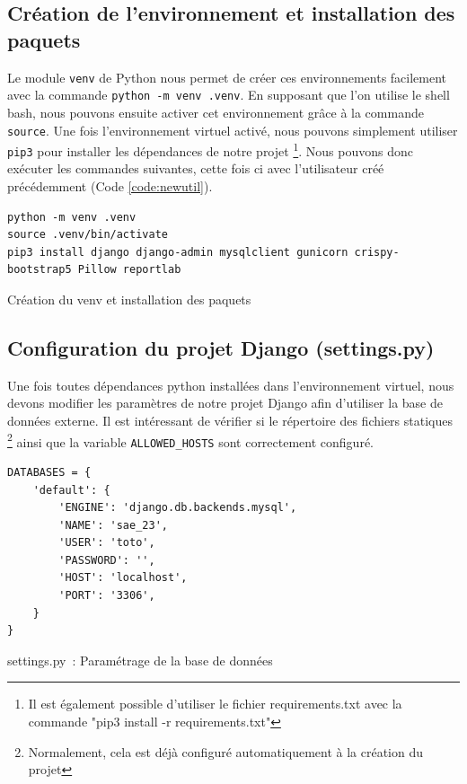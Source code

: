 \documentclass{article}
\begin{document}
        \subsection{Création de l'environnement et installation des paquets}
        Le module \verb|venv| de Python nous permet de créer ces environnements facilement avec la commande \verb|python -m venv .venv|.
        En supposant que l'on utilise le shell bash, nous pouvons ensuite activer cet environnement grâce à la commande \verb|source|.
        Une fois l'environnement virtuel activé, nous pouvons simplement utiliser \verb|pip3| pour installer les dépendances de notre projet
        \footnote{\label{note2}Il est également possible d'utiliser le fichier requirements.txt avec la commande "pip3 install -r requirements.txt"}. 
        Nous pouvons donc exécuter les commandes suivantes, cette fois ci avec l'utilisateur créé précédemment (Code \ref{code:newutil}). 
        \begin{listing}[H]
            \begin{verbatim}
python -m venv .venv
source .venv/bin/activate
pip3 install django django-admin mysqlclient gunicorn crispy-bootstrap5 Pillow reportlab
            \end{verbatim}
            \caption{Création du venv et installation des paquets}
            \label{code:creation-venv}
        \end{listing}
        
        \subsection{Configuration du projet Django (settings.py)}
        Une fois toutes dépendances python installées dans l'environnement virtuel, nous devons modifier les paramètres de notre projet Django afin d'utiliser la base de données externe.
        Il est intéressant de vérifier si le répertoire des fichiers statiques
        \footnote{\label{note3}Normalement, cela est déjà configuré automatiquement à la création du projet}
        ainsi que la variable \verb|ALLOWED_HOSTS| sont correctement configuré.
        \begin{listing}[H]
            \begin{verbatim}
DATABASES = {
    'default': {
        'ENGINE': 'django.db.backends.mysql',
        'NAME': 'sae_23',
        'USER': 'toto',
        'PASSWORD': '',
        'HOST': 'localhost',
        'PORT': '3306',
    }
}
            \end{verbatim}
            \caption{settings.py : Paramétrage de la base de données}
            \label{code:settings.py-db}
        \end{listing}
        
\end{document}
